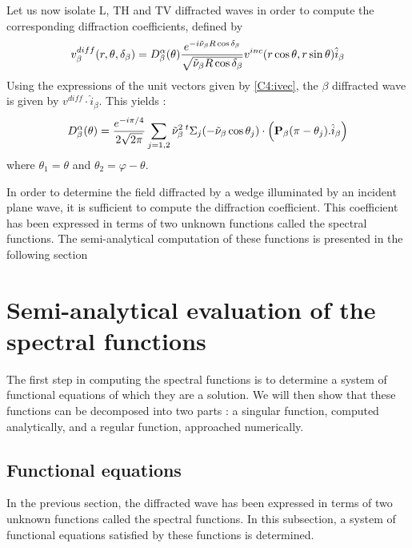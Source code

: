 Let us now isolate L, TH and TV diffracted waves in order to compute the corresponding diffraction coefficients, defined by
\begin{equation}
v_{\beta}^{diff}(r,\theta,\delta_{\beta})=D_{\beta}^{\alpha}(\theta)\frac{e^{-i\tilde{\nu}_{\beta}R\cos\delta_{\beta}}}{\sqrt{\tilde{\nu}_{\beta}R\cos\delta_{\beta}}} v^{inc}(r\cos\theta,r\sin\theta) \hat{i}_{\beta}
\label{C4:coeffdiff}
\end{equation}
Using the expressions of the unit vectors given by \eqref{C4:ivec}, the $\beta$ diffracted wave is given by $v^{diff}\cdot \hat{i}_{\beta}$. This yields :
\begin{equation}
D_{\beta}^{\alpha}(\theta)=\frac{e^{-i\pi/4}}{2\sqrt{2\pi}}\sum_{j=1,2}\tilde{\nu}_{\beta}^2 \,{}^t \Sigma_j(-\tilde{\nu}_{\beta}\cos\theta_j)\cdot\left(\mathbf{P}_{\beta}(\pi-\theta_j).\hat{i}_{\beta}\right)
\label{C4:Dbeta}
\end{equation}
where $\theta_1=\theta$ and $\theta_2=\varphi-\theta$.

In order to determine the field diffracted by a wedge illuminated by an incident plane wave, it is sufficient to compute the diffraction coefficient. This coefficient has been expressed in terms of two unknown functions called the spectral functions. The semi-analytical computation of these functions is presented in the following section

\section{Semi-analytical evaluation of the spectral functions}
The first step in computing the spectral functions is to determine a system of functional equations of which they are a solution. We will then show that these functions can be decomposed into two parts : a singular function, computed analytically, and a regular function, approached numerically.
\subsection{Functional equations}
In the previous section, the diffracted wave has been expressed in terms of two unknown functions called the spectral functions. In this subsection, a system of functional equations satisfied by these functions is determined. 


